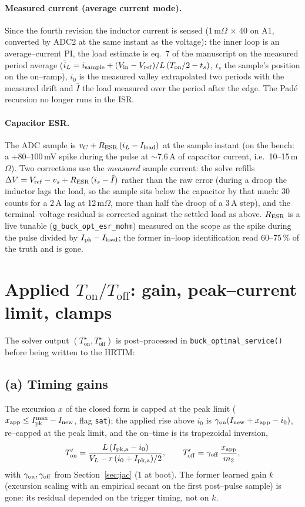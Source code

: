 \documentclass[11pt]{article}
\newcommand{\Ton}{T_{\mathrm{on}}}
\newcommand{\Toff}{T_{\mathrm{off}}}
\begin{document}
\paragraph{Measured current (average current mode).} Since the fourth revision
the inductor current is sensed (1\,m$\Omega$ $\times$ 40 on A1, converted by ADC2 at the
same instant as the voltage): the inner loop is an average--current PI, the load
estimate is eq.~7 of the manuscript on the measured period average
($\bar i_L=i_{\rm sample}+(V_{\rm in}-V_{\rm ref})/L\,(\Ton/2-t_s)$, $t_s$ the sample's
position on the on--ramp), $i_0$ is the measured valley extrapolated two periods
with the measured drift and $\hat I$ the load measured over the period after the
edge. The Pad\'e recursion no longer runs in the ISR.

\paragraph{Capacitor ESR.} The ADC sample is $v_C+R_{\rm ESR}\,(i_L-I_{\rm load})$ at
the sample instant (on the bench: a $+80$--$100$\,mV spike during the pulse at
$\sim$7.6\,A of capacitor current, i.e.\ 10--15\,m$\Omega$). Two corrections use the
\emph{measured} sample current: the solve refills
$\Delta V=V_{\rm ref}-v_s+R_{\rm ESR}\,(i_s-\hat I)$ rather than the raw error
(during a droop the inductor lags the load, so the sample sits below the
capacitor by that much: 30 counts for a 2\,A lag at 12\,m$\Omega$, more than half
the droop of a 3\,A step), and the terminal--voltage residual is corrected against
the settled load as above. $R_{\rm ESR}$ is a live tunable
(\texttt{g\_buck\_opt\_esr\_mohm}) measured on the scope as the spike during the
pulse divided by $I_{\rm pk}-I_{\rm load}$; the former in--loop identification read
60--75\,\% of the truth and is gone.

\section{Applied $\Ton/\Toff$: gain, peak--current limit, clamps}\label{sec:applied}
The solver output $(\Ton^\star,\Toff^\star)$ is post--processed in
\texttt{buck\_optimal\_service()} before being written to the HRTIM:

\subsection*{(a) Timing gains}
The excursion $x$ of the closed form is capped at the peak limit
($x_{\rm app}\le I_{\rm pk}^{\max}-I_{\rm new}$, flag \texttt{sat}); the applied rise
above $i_0$ is $\gamma_{\rm on}(I_{\rm new}+x_{\rm app}-i_0)$, re--capped at the
peak limit, and the on--time is its trapezoidal inversion,
\begin{equation}
\Ton'=\frac{L\,(I_{\rm pk,a}-i_0)}{V_L-r\,(i_0+I_{\rm pk,a})/2},\qquad
\Toff'=\gamma_{\rm off}\,\frac{x_{\rm app}}{m_2},
\end{equation}
with $\gamma_{\rm on},\gamma_{\rm off}$ from Section~\ref{sec:jac} (1 at boot).
The former learned gain $k$ (excursion scaling with an empirical secant on the
first post--pulse sample) is gone: its residual depended on the trigger timing,
not on $k$.
\end{document}
